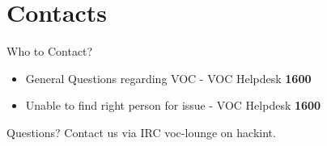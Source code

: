 \documentclass[aspectratio=169]{beamer}
\begin{document}
\section{Contacts}			%
\begin{frame}{Who to Contact?}
\begin{itemize}
	\item General Questions regarding VOC - VOC Helpdesk \textbf{1600}
	\item Unable to find right person for issue - VOC Helpdesk \textbf{1600}
\end{itemize} 
\end{frame}

\begin{frame}{Questions?}
Contact us via IRC voc-lounge on hackint.
\end{frame}

\end{document}
